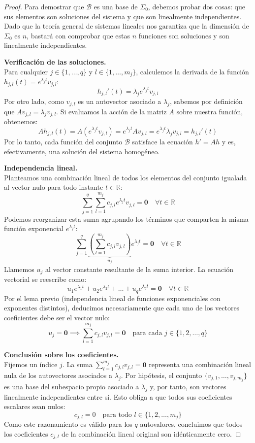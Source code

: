 \begin{proof}
    Para demostrar que $\mathcal{B}$ es una base de $\Sigma_0$, debemos probar dos cosas: que sus elementos son soluciones del sistema y que son linealmente independientes. Dado que la teoría general de sistemas lineales nos garantiza que la dimensión de $\Sigma_0$ es $n$, bastará con comprobar que estas $n$ funciones son soluciones y son linealmente independientes.

    \textbf{Verificación de las soluciones.} \\
    Para cualquier $j \in \{1, \dots, q\}$ y $l \in \{1, \dots, m_j\}$, calculemos la derivada de la función $h_{j,l}(t) = e^{\lambda_j t} v_{j,l}$:
    \[
        h_{j,l}'(t) = \lambda_j e^{\lambda_j t} v_{j,l}
    \]
    Por otro lado, como $v_{j,l}$ es un autovector asociado a $\lambda_j$, sabemos por definición que $A v_{j,l} = \lambda_j v_{j,l}$. Si evaluamos la acción de la matriz $A$ sobre nuestra función, obtenemos:
    \[
        A h_{j,l}(t) = A (e^{\lambda_j t} v_{j,l}) = e^{\lambda_j t} A v_{j,l} = e^{\lambda_j t} \lambda_j v_{j,l} = h_{j,l}'(t)
    \]
    Por lo tanto, cada función del conjunto $\mathcal{B}$ satisface la ecuación $h' = Ah$ y es, efectivamente, una solución del sistema homogéneo.

    \textbf{Independencia lineal.} \\
    Planteamos una combinación lineal de todos los elementos del conjunto igualada al vector nulo para todo instante $t \in \mathbb{R}$:
    \[
        \sum_{j=1}^q \sum_{l=1}^{m_j} c_{j,l} e^{\lambda_j t} v_{j,l} = \mathbf{0} \quad \forall t \in \mathbb{R}
    \]
    Podemos reorganizar esta suma agrupando los términos que comparten la misma función exponencial $e^{\lambda_j t}$:
    \[
        \sum_{j=1}^q \underbrace{\left( \sum_{l=1}^{m_j} c_{j,l} v_{j,l} \right)}_{u_j} e^{\lambda_j t} = \mathbf{0} \quad \forall t \in \mathbb{R}
    \]
    Llamemos $u_j$ al vector constante resultante de la suma interior. La ecuación vectorial se reescribe como:
    \[
        u_1 e^{\lambda_1 t} + u_2 e^{\lambda_2 t} + \dots + u_q e^{\lambda_q t} = \mathbf{0} \quad \forall t \in \mathbb{R}
    \]
    Por el lema previo (independencia lineal de funciones exponenciales con exponentes distintos), deducimos necesariamente que cada uno de los vectores coeficientes debe ser el vector nulo:
    \[
        u_j = \mathbf{0} \implies \sum_{l=1}^{m_j} c_{j,l} v_{j,l} = \mathbf{0} \quad \text{para cada } j \in \{1, 2, \dots, q\}
    \]
    
    \textbf{Conclusión sobre los coeficientes.} \\
    Fijemos un índice $j$. La suma $\sum_{l=1}^{m_j} c_{j,l} v_{j,l} = \mathbf{0}$ representa una combinación lineal nula de los autovectores asociados a $\lambda_j$. Por hipótesis, el conjunto $\{v_{j,1}, \dots, v_{j,m_j}\}$ es una base del subespacio propio asociado a $\lambda_j$ y, por tanto, son vectores linealmente independientes entre sí. Esto obliga a que todos sus coeficientes escalares sean nulos:
    \[
        c_{j,l} = 0 \quad \text{para todo } l \in \{1, 2, \dots, m_j\}
    \]
    Como este razonamiento es válido para los $q$ autovalores, concluimos que todos los coeficientes $c_{j,l}$ de la combinación lineal original son idénticamente cero.


\end{proof}
